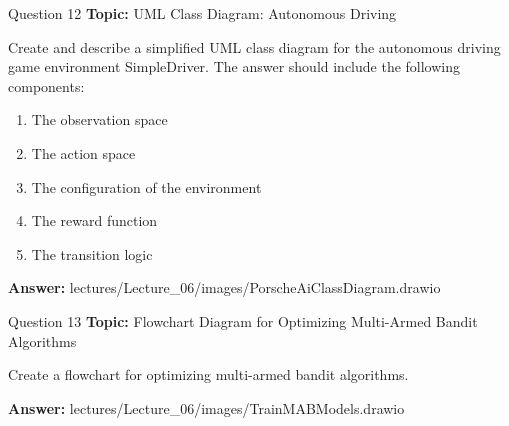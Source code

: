 \begin{frame}{Question 12}
    \textbf{Topic:} UML Class Diagram: Autonomous Driving
    \vspace{10pt}

    Create and describe a simplified UML class diagram for the autonomous driving game environment \glqq SimpleDriver\grqq.
    The answer should include the following components:
    \begin{enumerate}
        \item The observation space
        \item The action space
        \item The configuration of the environment
        \item The reward function
        \item The transition logic
    \end{enumerate}
    \vspace{20pt}

    \textbf{Answer:} lectures/Lecture\_06/images/PorscheAiClassDiagram.drawio
\end{frame}

\begin{frame}{Question 13}
    \textbf{Topic:} Flowchart Diagram for Optimizing Multi-Armed Bandit Algorithms
    \vspace{10pt}

    Create a flowchart for optimizing multi-armed bandit algorithms. 
    \vspace{20pt}

    \textbf{Answer:} lectures/Lecture\_06/images/TrainMABModels.drawio
\end{frame}

